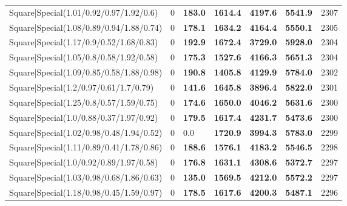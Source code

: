 \begin{tabular}{lrllllr}
 Square|Special(1.01/0.92/0.97/1.92/0.6)                       &             0   & \textbf{183.0} & \textbf{1614.4} & \textbf{4197.6} & \textbf{5541.9} &         2307 \\
 Square|Special(1.08/0.89/0.94/1.88/0.74)                      &             0   & \textbf{178.1} & \textbf{1634.2} & \textbf{4164.4} & \textbf{5550.1} &         2305 \\
 Square|Special(1.17/0.9/0.52/1.68/0.83)                       &             0   & \textbf{192.9} & \textbf{1672.4} & \textbf{3729.0} & \textbf{5928.0} &         2304 \\
 Square|Special(1.05/0.8/0.58/1.92/0.58)                       &             0   & \textbf{175.3} & \textbf{1527.6} & \textbf{4166.3} & \textbf{5651.3} &         2304 \\
 Square|Special(1.09/0.85/0.58/1.88/0.98)                      &             0   & \textbf{190.8} & \textbf{1405.8} & \textbf{4129.9} & \textbf{5784.0} &         2302 \\
 Square|Special(1.2/0.97/0.61/1.7/0.79)                        &             0   & \textbf{141.6} & \textbf{1645.8} & \textbf{3896.4} & \textbf{5822.0} &         2301 \\
 Square|Special(1.25/0.8/0.57/1.59/0.75)                       &             0   & \textbf{174.6} & \textbf{1650.0} & \textbf{4046.2} & \textbf{5631.6} &         2300 \\
 Square|Special(1.0/0.88/0.37/1.97/0.92)                       &             0   & \textbf{179.5} & \textbf{1617.4} & \textbf{4231.7} & \textbf{5473.6} &         2300 \\
 Square|Special(1.02/0.98/0.48/1.94/0.52)                      &             0   & 0.0            & \textbf{1720.9} & \textbf{3994.3} & \textbf{5783.0} &         2299 \\
 Square|Special(1.11/0.89/0.41/1.78/0.86)                      &             0   & \textbf{188.6} & \textbf{1576.1} & \textbf{4183.2} & \textbf{5546.5} &         2298 \\
 Square|Special(1.0/0.92/0.89/1.97/0.58)                       &             0   & \textbf{176.8} & \textbf{1631.1} & \textbf{4308.6} & \textbf{5372.7} &         2297 \\
 Square|Special(1.03/0.98/0.68/1.86/0.63)                      &             0   & \textbf{135.0} & \textbf{1569.5} & \textbf{4212.0} & \textbf{5572.2} &         2297 \\
 Square|Special(1.18/0.98/0.45/1.59/0.97)                      &             0   & \textbf{178.5} & \textbf{1617.6} & \textbf{4200.3} & \textbf{5487.1} &         2296 \\

\end{tabular}
